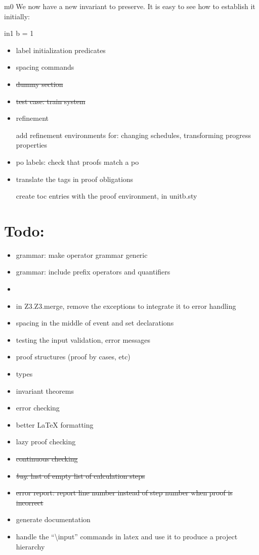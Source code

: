 \documentclass[12pt]{amsart}
\begin{document}
\begin{machine}{m0}
We now have a new invariant to preserve. It is easy to see how to establish it initially:
%
\begin{initialization}{in1}
	b = 1
\end{initialization}

\begin{itemize}
\item label initialization predicates
\item spacing commands
\item \sout{dummy section}
\item \sout{test case: train system}
\item refinement

	add refinement environments for: changing schedules, transforming progress properties
\item po labels: check that proofs match a po
\item translate the tags in proof obligations
	
	create toc entries with the proof environment, in unitb.sty
\end{itemize}

\section{Todo:}
\begin{itemize}
\item grammar: make operator grammar generic
\item grammar: include prefix operators and quantifiers
\item 
\item in Z3.Z3.merge, remove the exceptions to integrate it to error handling
\item spacing in the middle of event and set declarations
\item testing the input validation, error messages
\item proof structures (proof by cases, etc)
\item types
\item invariant theorems
\item error checking
\item better LaTeX formatting
\item lazy proof checking
\item \sout{continuous checking}
\item \sout{\emph{bug}: last of empty list of calculation steps}
\item \sout{error report: report line number instead of step number when proof is incorrect}
\item generate documentation
\item handle the ``\textbackslash input'' commands in latex and use it to produce a project hierarchy
\end{itemize}


\end{machine}
\end{document}
